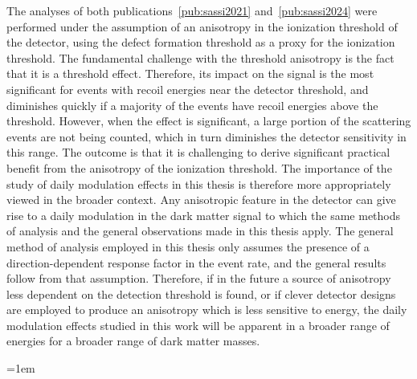 The analyses of both publications~\ref{pub:sassi2021} and~\ref{pub:sassi2024} were performed under the assumption of an anisotropy in the ionization threshold of the detector, using the defect formation threshold as a proxy for the ionization threshold. The fundamental challenge with the threshold anisotropy is the fact that it is a threshold effect. Therefore, its impact on the signal is the most significant for events with recoil energies near the detector threshold, and diminishes quickly if a majority of the events have recoil energies above the threshold. However, when the effect is significant, a large portion of the scattering events are not being counted, which in turn diminishes the detector sensitivity in this range. The outcome is that it is challenging to derive significant practical benefit from the anisotropy of the ionization threshold. The importance of the study of daily modulation effects in this thesis is therefore more appropriately viewed in the broader context. Any anisotropic feature in the detector can give rise to a daily modulation in the dark matter signal to which the same methods of analysis and the general observations made in this thesis apply. The general method of analysis employed in this thesis only assumes the presence of a direction-dependent response factor in the event rate, and the general results follow from that assumption. Therefore, if in the future a source of anisotropy less dependent on the detection threshold is found, or if clever detector designs are employed to produce an anisotropy which is less sensitive to energy, the daily modulation effects studied in this work will be apparent in a broader range of energies for a broader range of dark matter masses.

\backmatter

\emergencystretch=1em
\printbibliography[heading = bibintoc, title = References]


